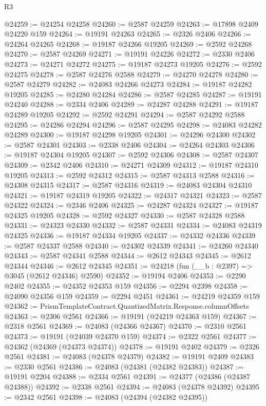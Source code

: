 \begin{lexlean}{R3}
\begin{coremodule}
@24259 := @24254 @24258
@24260 := @2587 @24259
@24263 := @17898 @2409 @24220 @159
@24264 := @19191 @24263
@24265 := @2326 @2406
@24266 := @24264 @24265
@24268 := @19187 @24266 @19205
@24269 := @2592 @24268
@24270 := @2587 @24269
@24271 := @19191 @24226
@24272 := @2330 @2406
@24273 := @24271 @24272
@24275 := @19187 @24273 @19205
@24276 := @2592 @24275
@24278 := @2587 @24276 @2588
@24279 := @24270 @24278
@24280 := @2587 @24279
@24282 := @24083 @24266 @24273
@24284 := @19187 @24282 @19205
@24285 := @24280 @24284
@24286 := @2587 @24285
@24287 := @19191 @24240
@24288 := @2334 @2406
@24289 := @24287 @24288
@24291 := @19187 @24289 @19205
@24292 := @2592 @24291
@24294 := @2587 @24292 @2588
@24295 := @24286 @24294
@24296 := @2587 @24295
@24298 := @24083 @24282 @24289
@24300 := @19187 @24298 @19205
@24301 := @24296 @24300
@24302 := @2587 @24301
@24303 := @2338 @2406
@24304 := @24264 @24303
@24306 := @19187 @24304 @19205
@24307 := @2592 @24306
@24308 := @2587 @24307
@24309 := @2342 @2406
@24310 := @24271 @24309
@24312 := @19187 @24310 @19205
@24313 := @2592 @24312
@24315 := @2587 @24313 @2588
@24316 := @24308 @24315
@24317 := @2587 @24316
@24319 := @24083 @24304 @24310
@24321 := @19187 @24319 @19205
@24322 := @24317 @24321
@24323 := @2587 @24322
@24324 := @2346 @2406
@24325 := @24287 @24324
@24327 := @19187 @24325 @19205
@24328 := @2592 @24327
@24330 := @2587 @24328 @2588
@24331 := @24323 @24330
@24332 := @2587 @24331
@24334 := @24083 @24319 @24325
@24336 := @19187 @24334 @19205
@24337 := @24332 @24336
@24339 := @2587 @24337 @2588
@24340 := @24302 @24339
@24341 := @24260 @24340
@24343 := @2587 @24341 @2588
@24344 := @2612 @24343
@24345 := @2612 @24344
@24346 := @2612 @24345
@24351 := @24218 (fun (__b : @2397) => @3045 (@2612 @24346) @2590)
@24352 := @19194 @2406
@24353 := @2290 @2402
@24355 := @24352 @24353 @159
@24356 := @2294 @2398
@24358 := @24090 @24356 @159
@24359 := @2294 @2451
@24361 := @24219 @24359 @159
@24362 := PrismTemplateContract.QuantizedMatrix.Response.columnOffsets
@24363 := @2306 @2561
@24366 := @19191 (@24219 @24363 @159)
@24367 := @2318 @2561
@24369 := @24083 (@24366 @24367)
@24370 := @2310 @2561
@24373 := @19191 (@24039 @24370 @159)
@24374 := @2322 @2561
@24377 := @24362 (@24369 (@24373 @24374))
@24378 := @19191 @2402
@24379 := @2326 @2561
@24381 := @24083 (@24378 @24379)
@24382 := @19191 @2409
@24383 := @2330 @2561
@24386 := @24083 (@24381 (@24382 @24383))
@24387 := @19191 @2204
@24388 := @2334 @2561
@24391 := @24377 (@24386 (@24387 @24388))
@24392 := @2338 @2561
@24394 := @24083 (@24378 @24392)
@24395 := @2342 @2561
@24398 := @24083 (@24394 (@24382 @24395))

\end{coremodule}
\end{lexlean}
